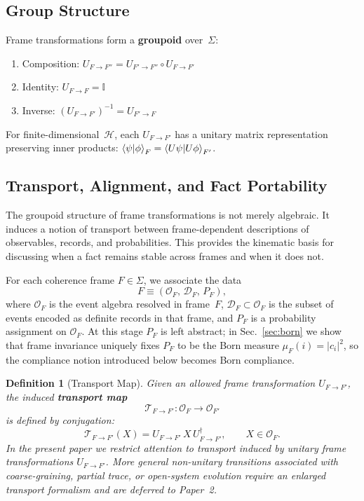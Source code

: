 \documentclass[aps,prd,twocolumn,superscriptaddress,nofootinbib,floatfix]{revtex4-2}
\newtheorem{definition}{Definition}
\newcommand{\Sig}{\Sigma}
\begin{document}
\subsection{Group Structure}

Frame transformations form a \textbf{groupoid} over~$\Sig$:
\begin{enumerate}
\item Composition: $U_{F \to F''} = U_{F' \to F''} \circ U_{F \to F'}$
\item Identity: $U_{F \to F} = \mathbb{I}$
\item Inverse: $(U_{F \to F'})^{-1} = U_{F' \to F}$
\end{enumerate}
For finite-dimensional~$\mathcal{H}$, each $U_{F \to F'}$ has a unitary matrix representation preserving inner products: $\braket{\psi|\phi}_F = \braket{U\psi | U\phi}_{F'}$.

\subsection{Transport, Alignment, and Fact Portability}\label{sec:transport}

The groupoid structure of frame transformations is not merely algebraic. It induces a notion of transport between frame-dependent descriptions of observables, records, and probabilities. This provides the kinematic basis for discussing when a fact remains stable across frames and when it does not.

For each coherence frame $F \in \Sig$, we associate the data
\begin{equation}\label{eq:frame-data}
F \equiv (\mathcal{O}_F,\, \mathcal{D}_F,\, P_F),
\end{equation}
where $\mathcal{O}_F$ is the event algebra resolved in frame~$F$, $\mathcal{D}_F \subset \mathcal{O}_F$ is the subset of events encoded as definite records in that frame, and $P_F$ is a probability assignment on $\mathcal{O}_F$. At this stage $P_F$ is left abstract; in Sec.~\ref{sec:born} we show that frame invariance uniquely fixes $P_F$ to be the Born measure $\mu_F(i) = |c_i|^2$, so the compliance notion introduced below becomes Born compliance.

\begin{definition}[Transport Map]\label{def:transport}
Given an allowed frame transformation $U_{F \to F'}$, the induced \textbf{transport map}
\begin{equation}\label{eq:transport-conjugation}
\mathcal{T}_{F \to F'} : \mathcal{O}_F \to \mathcal{O}_{F'}
\end{equation}
is defined by conjugation:
\begin{equation}
\mathcal{T}_{F \to F'}(X) = U_{F \to F'}\, X\, U_{F \to F'}^\dagger, \qquad X \in \mathcal{O}_F.
\end{equation}
In the present paper we restrict attention to transport induced by unitary frame transformations $U_{F\to F'}$. More general non-unitary transitions associated with coarse-graining, partial trace, or open-system evolution require an enlarged transport formalism and are deferred to Paper~2.
\end{definition}
\end{document}

